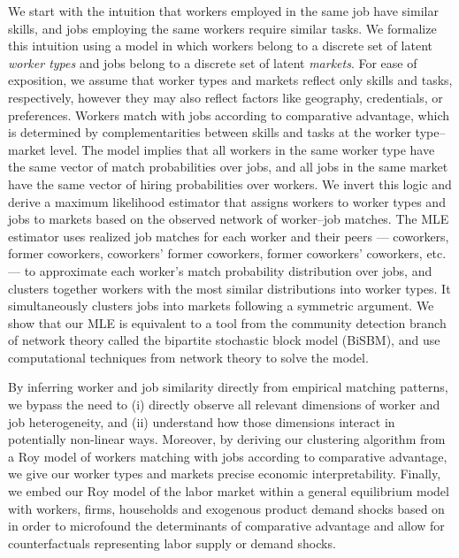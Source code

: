 \documentclass[12pt]{article}
\theoremstyle{definition}
\theoremstyle{plain}
\begin{document}
We start with the intuition that workers employed in the same job have similar skills, and jobs employing the same workers require similar tasks. We formalize this intuition using a \citet{Roy1951} model in which workers belong to a discrete set of latent \emph{worker types} and jobs belong to a discrete set of latent \emph{markets}. For ease of exposition, we assume that worker types and markets reflect only skills and tasks, respectively, however they may also reflect factors like geography, credentials, or preferences.  Workers match with jobs according to comparative advantage, which is determined by complementarities between skills and tasks at the worker type--market level. The model implies that all workers in the same worker type have the same vector of match probabilities over jobs, and all jobs in the same market have the same vector of hiring probabilities over workers. We invert this logic and derive a maximum likelihood estimator that assigns workers to worker types and jobs to markets based on the observed network of worker--job matches. The MLE estimator uses realized job matches for each worker and their peers --- coworkers, former coworkers, coworkers' former coworkers, former coworkers' coworkers, etc. --- to approximate each worker's match probability distribution over jobs, and clusters together workers with the most similar distributions into worker types. It simultaneously clusters jobs into markets following a symmetric argument. We show that our MLE is equivalent to a tool from the community detection branch of network theory called the bipartite stochastic block model (BiSBM), and use computational techniques from network theory to solve the model. 


By inferring worker and job similarity directly from empirical matching patterns, we bypass the need to (i) directly observe all relevant dimensions of worker and job heterogeneity, and (ii) understand how those dimensions interact in potentially non-linear ways. Moreover, by deriving our clustering algorithm from a Roy model of workers matching with jobs according to comparative advantage, we give our worker types and markets precise economic interpretability. Finally, we embed our Roy model of the labor market within a general equilibrium model with workers, firms, households and exogenous product demand shocks based on \citet{Grigsby2019} in order to microfound the determinants of comparative advantage and allow for counterfactuals representing labor supply or demand shocks. 
\end{document}
